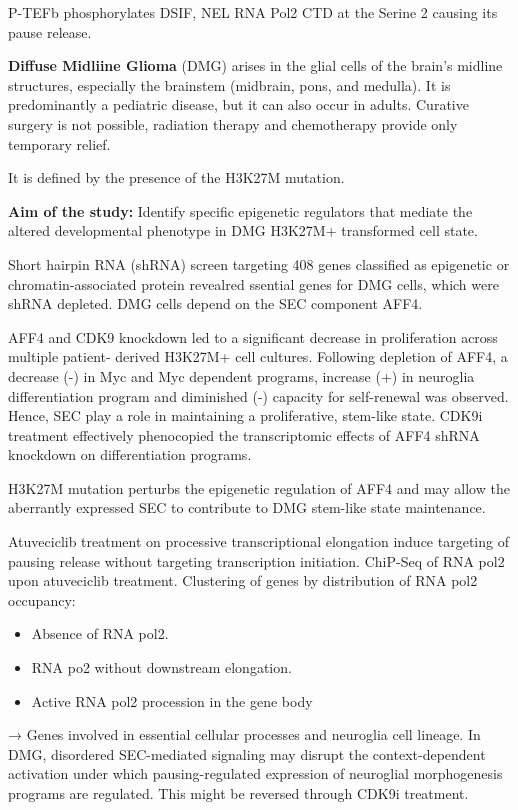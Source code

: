 P-TEFb phosphorylates DSIF, NEL RNA Pol2 CTD at the Serine 2 causing its pause release.

\textbf{Diffuse Midliine Glioma} (DMG) arises in the glial cells of the brain’s midline
structures, especially the brainstem (midbrain,
pons, and medulla).  It is predominantly a pediatric disease, but it can
also occur in adults.
Curative surgery is not possible, radiation therapy
and chemotherapy provide only temporary relief.

It is defined by the presence of the H3K27M mutation.

\textbf{Aim of the study:} Identify specific epigenetic regulators that mediate the
altered developmental phenotype in DMG H3K27M+
transformed cell state.

Short hairpin RNA (shRNA) screen targeting 408 genes classified as epigenetic or chromatin-associated
protein revealred ssential genes for DMG cells, which were shRNA depleted.  DMG cells depend on the SEC component AFF4.

AFF4 and CDK9 knockdown led to a significant
decrease in proliferation across multiple patient-
derived H3K27M+ cell cultures.
Following depletion of AFF4, a decrease (-) in Myc and Myc dependent programs, increase (+) in neuroglia differentiation program
and diminished (-) capacity for self-renewal was observed. Hence, SEC play a role in maintaining a proliferative, stem-like state. CDK9i treatment effectively phenocopied the transcriptomic effects of AFF4 shRNA knockdown on differentiation programs.

H3K27M mutation perturbs the epigenetic regulation of AFF4 and may allow the aberrantly expressed SEC to contribute to DMG stem-like state maintenance.

Atuveciclib treatment on processive transcriptional
elongation induce targeting of pausing release
without targeting transcription initiation. ChiP-Seq of RNA pol2 upon atuveciclib treatment.
Clustering of genes by distribution of RNA pol2
occupancy:
\begin{itemize}
\tightlist
\item Absence of RNA pol2.
\item RNA po2 without downstream elongation.
\item Active RNA pol2 procession in the gene body
\end{itemize}
→ Genes involved in essential cellular
processes and neuroglia cell lineage.
In DMG, disordered SEC-mediated signaling may disrupt the context-dependent activation under which
pausing-regulated expression of neuroglial morphogenesis programs are regulated. This might be
reversed through CDK9i treatment.

